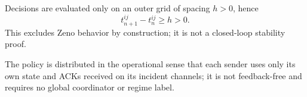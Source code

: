 Decisions are evaluated only on an outer grid of spacing $h>0$, hence
\begin{equation}
 t_{n+1}^{ij}-t_n^{ij}\geq h>0 .
 \label{eq:nozeno}
\end{equation}
This excludes Zeno behavior by construction; it is not a closed-loop stability
proof.

The policy is distributed in the operational sense that each sender uses only
its own state and ACKs received on its incident channels; it is not
feedback-free and requires no global coordinator or regime label.
